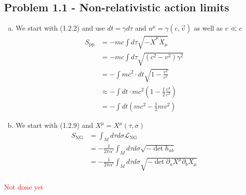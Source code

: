 \documentclass[../main.tex]{subfiles}
\begin{document}
\subsection{Problem 1.1 - Non-relativistic action limits}
\begin{enumerate}[(a)]
    \item We start with (1.2.2) and use $dt=\gamma d\tau$ and $u^\mu=\gamma(c,\vec{v})$ as well as $v\ll c$
    \begin{align}
        S_\text{pp}&=-mc\int d\tau\sqrt{-\dot X^\mu\dot X_\mu}\\
        &=-mc\int d\tau\sqrt{(c^2-v^2)\gamma^2}\\
        &=-\int mc^2\cdot dt\sqrt{1-\frac{v^2}{c^2}}\\
        &\approx-\int dt\cdot mc^2\left(1-\frac{1}{2}\frac{v^2}{c^2}\right)\\
        &=-\int dt\left(mc^2-\frac{1}{2}mv^2\right)
    \end{align}
    
    \item We start with (1.2.9) and $X^\mu=X^\mu(\tau,\sigma)$
    \begin{align}
        S_\text{NG}
        &=\int_Md\tau d\sigma \mathcal{L}_\text{NG}\\
        &=-\frac{1}{2\pi\alpha'}\int_Md\tau d\sigma \sqrt{-\det h_{ab}}\\
        &=-\frac{1}{2\pi\alpha'}\int_Md\tau d\sigma \sqrt{-\det \partial_aX^\mu\partial_bX_\mu}\\
    \end{align}
    
\end{enumerate}

\textcolor{red}{Not done yet}
\end{document}
